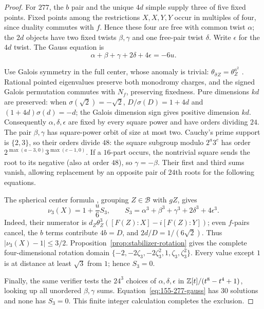 \begin{proof}
For $277$, the $b$ pair and the unique $4d$ simple supply three of five
fixed points. Fixed points among the restrictions $X,X,Y,Y$ occur in
multiples of four, since duality commutes with $f$. Hence these four
are free with common twist $\alpha$; the $2d$ objects have two fixed
twists $\beta,\gamma$ and one free-pair twist $\delta$. Write
$\epsilon$ for the $4d$ twist. The Gauss equation is
\begin{equation}\label{eq:155-277-gauss}
 \alpha+\beta+\gamma+2\delta+4\epsilon=-6u.
\end{equation}

Use Galois symmetry in the full center, whose anomaly is trivial:
$\theta_{\widehat\sigma Z}=\theta_Z^{a^2}$
\cite[Theorem~II]{DLN}. Rational pointed eigenvalues preserve both
monodromy charges, and the signed Galois permutation commutes with
$N_f$, preserving fixedness. Pure dimensions $kd$ are preserved: when
$\sigma(\sqrt2)=-\sqrt2$,
$D/\sigma(D)=1+4d$ and $(1+4d)\sigma(d)=-d$;
the Galois dimension sign gives positive dimension $kd$.
Consequently $\alpha,\delta,\epsilon$ are fixed by every square power
and have orders dividing $24$. The pair $\beta,\gamma$ has square-power
orbit of size at most two. Cauchy's prime support is $\{2,3\}$, so their
orders divide $48$: the square subgroup modulo $2^a3^c$ has order
$2^{\max(a-3,0)}3^{\max(c-1,0)}$. If a $16$-part occurs, the nontrivial
square sends the root to its negative (also at order $48$), so
$\gamma=-\beta$. Their first and third sums vanish, allowing replacement
by an opposite pair of $24$th roots for the following equations.

The spherical center formula \cite[Theorem~4.1]{NS}, grouping
$Z\in\mathcal B$ with $gZ$, gives
\[
 \nu_3(X)=1+\frac{u}{6}S_3,\qquad
 S_3=\alpha^3+\beta^3+\gamma^3+2\delta^3+4\epsilon^3.
\]
Indeed, their numerator is
$d_Z\theta_Z^3([F(Z):X]-i[F(Z):Y])$; even $f$-pairs cancel,
the $b$ terms contribute $4b=D$, and $2d/D=1/(6\sqrt2)$.
Thus $|\nu_3(X)-1|\le3/2$. Proposition~\ref{prop:stabilizer-rotation}
gives the complete four-dimensional rotation domain
$\{-2,-2\zeta_3,-2\zeta_3^2,1,\zeta_3,\zeta_3^2\}$.
Every value except $1$ is at distance at least $\sqrt3$ from $1$;
hence $S_3=0$.

Finally, the same verifier tests the $24^3$ choices of
$\alpha,\delta,\epsilon$ in
$\mathbb Z[t]/(t^8-t^4+1)$, looking up all unordered $\beta,\gamma$ sums.
Equation~\eqref{eq:155-277-gauss} has $30$ solutions and none has
$S_3=0$. This finite integer calculation completes the exclusion.
\end{proof}

